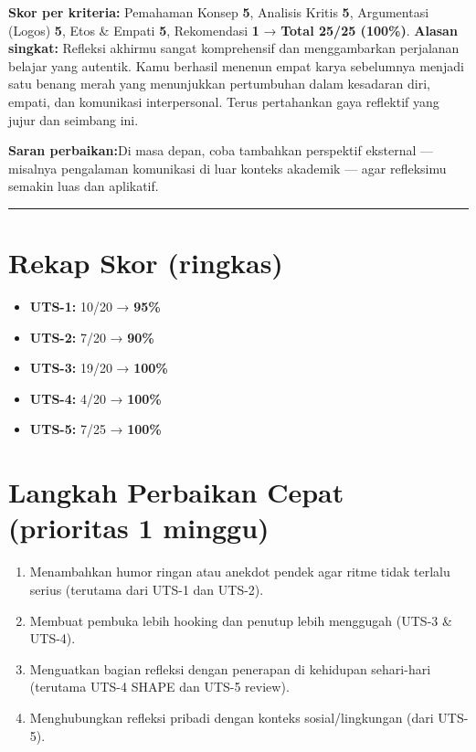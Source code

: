 \documentclass[
  letterpaper,
  DIV=11,
  numbers=noendperiod]{scrreprt}
\providecommand{\tightlist}{%
  \setlength{\itemsep}{0pt}\setlength{\parskip}{0pt}}
\begin{document}
\textbf{Skor per kriteria:} Pemahaman Konsep \textbf{5}, Analisis Kritis
\textbf{5}, Argumentasi (Logos) \textbf{5}, Etos \& Empati \textbf{5},
Rekomendasi \textbf{1} → \textbf{Total 25/25 (100\%)}. \textbf{Alasan
singkat:} Refleksi akhirmu sangat komprehensif dan menggambarkan
perjalanan belajar yang autentik. Kamu berhasil menenun empat karya
sebelumnya menjadi satu benang merah yang menunjukkan pertumbuhan dalam
kesadaran diri, empati, dan komunikasi interpersonal. Terus pertahankan
gaya reflektif yang jujur dan seimbang ini.

\textbf{Saran perbaikan:}Di masa depan, coba tambahkan perspektif
eksternal --- misalnya pengalaman komunikasi di luar konteks akademik
--- agar refleksimu semakin luas dan aplikatif.

\begin{center}\rule{0.5\linewidth}{0.5pt}\end{center}

\section{Rekap Skor (ringkas)}\label{rekap-skor-ringkas}

\begin{itemize}
\tightlist
\item
  \textbf{UTS-1:} 10/20 → \textbf{95\%}
\item
  \textbf{UTS-2:} 7/20 → \textbf{90\%}
\item
  \textbf{UTS-3:} 19/20 → \textbf{100\%}
\item
  \textbf{UTS-4:} 4/20 → \textbf{100\%}
\item
  \textbf{UTS-5:} 7/25 → \textbf{100\%}
\end{itemize}

\section{Langkah Perbaikan Cepat (prioritas 1
minggu)}\label{langkah-perbaikan-cepat-prioritas-1-minggu}

\begin{enumerate}
\def\labelenumi{\arabic{enumi}.}
\tightlist
\item
  Menambahkan humor ringan atau anekdot pendek agar ritme tidak terlalu
  serius (terutama dari UTS-1 dan UTS-2).
\item
  Membuat pembuka lebih hooking dan penutup lebih menggugah (UTS-3 \&
  UTS-4).
\item
  Menguatkan bagian refleksi dengan penerapan di kehidupan sehari-hari
  (terutama UTS-4 SHAPE dan UTS-5 review).
\item
  Menghubungkan refleksi pribadi dengan konteks sosial/lingkungan (dari
  UTS-5).
\end{enumerate}
\end{document}

